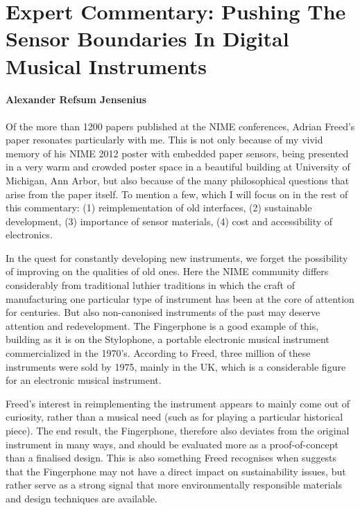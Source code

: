 \section*{Expert Commentary: Pushing The Sensor Boundaries In Digital Musical Instruments}


\paragraph{Alexander Refsum Jensenius}


Of the more than 1200 papers published at the NIME conferences, Adrian Freed's paper resonates particularly with me. This is not only because of my vivid memory of his NIME 2012 poster with embedded paper sensors, being presented in a very warm and crowded poster space in a beautiful building at University of Michigan, Ann Arbor, but also because of the many philosophical questions that arise from the paper itself. To mention a few, which I will focus on in the rest of this commentary: (1) reimplementation of old interfaces, (2) sustainable development, (3) importance of sensor materials, (4) cost and accessibility of electronics.

In the quest for constantly developing new instruments, we forget the possibility of improving on the qualities of old ones. Here the NIME community differs considerably from traditional luthier traditions in which the craft of manufacturing one particular type of instrument has been at the core of attention for centuries. But also non-canonised instruments of the past may deserve attention and redevelopment. The Fingerphone is a good example of this, building as it is on the Stylophone, a portable electronic musical instrument commercialized in the 1970's. According to Freed, three million of these instruments were sold by 1975, mainly in the UK, which is a considerable figure for an electronic musical instrument.

Freed's interest in reimplementing the instrument appears to mainly come out of curiosity, rather than a musical need (such as for playing a particular historical piece). The end result, the Fingerphone, therefore also deviates from the original instrument in many ways, and should be evaluated more as a proof-of-concept than a finalised design. This is also something Freed recognises when suggests that the Fingerphone may not have a direct impact on sustainability issues, but rather serve as a strong signal that more environmentally responsible materials and design techniques are available.


